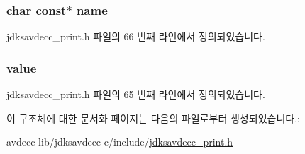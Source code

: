 \subsubsection[{\texorpdfstring{name}{name}}]{\setlength{\rightskip}{0pt plus 5cm}char const$\ast$ name}\hypertarget{structjdksavdecc__uint32__name_a5f1de76dd5d451949e12c0fbc966ca70}{}\label{structjdksavdecc__uint32__name_a5f1de76dd5d451949e12c0fbc966ca70}


jdksavdecc\+\_\+print.\+h 파일의 66 번째 라인에서 정의되었습니다.

\subsubsection[{\texorpdfstring{value}{value}}]{ value}\hypertarget{structjdksavdecc__uint32__name_ae7f66047e6e39ba2bb6af8b95f00d1dd}{}\label{structjdksavdecc__uint32__name_ae7f66047e6e39ba2bb6af8b95f00d1dd}


jdksavdecc\+\_\+print.\+h 파일의 65 번째 라인에서 정의되었습니다.



이 구조체에 대한 문서화 페이지는 다음의 파일로부터 생성되었습니다.\+:\begin{DoxyCompactItemize}
\item 
avdecc-\/lib/jdksavdecc-\/c/include/\hyperlink{jdksavdecc__print_8h}{jdksavdecc\+\_\+print.\+h}\end{DoxyCompactItemize}
